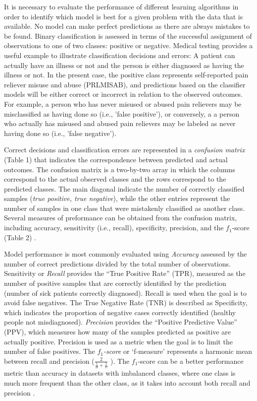 \documentclass[sigconf]{acmart}
\begin{document}
It is necessary to evaluate the performance of different learning algorithms
in order to identify which model is best for a given problem with the data 
that is available. No model can make perfect predictions as there are always 
mistakes to be found. Binary classification is assessed in terms of the 
successful assignment of observations to one of two classes: positive or 
negative. Medical testing provides a useful example to illustrate 
classification decisions and errors: A patient can actually have an illness 
or not and the person is either diagnosed as having the illness or not. In 
the present case, the positive class represents self-reported pain reliever 
misuse and abuse (PRLMISAB), and predictions based on the classifier models 
will be either correct or incorrect in relation to the observed outcomes. 
For example, a person who has never misused or abused pain relievers may be 
misclassified as having done so (i.e., 'false positive'), or conversely, a 
a person who actually has misused and abused pain relievers may be labeled 
as never having done so (i.e., 'false negative').


Correct decisions and classification errors are represented in a 
\emph{confusion matrix} (Table 1) that indicates the correspondence between 
predicted and actual outcomes. The confusion matrix is a two-by-two array in 
which the columns correspond to the actual observed classes and the rows 
correspond to the predicted classes. The main diagonal indicate the number of 
correctly classified samples (\emph{true positive, true negative}), while the 
other entries represent the number of samples in one class that were mistakenly 
classified as another class. Several measures of preformance can be obtained
from the confusion matrix, including accuracy, sensitivity (i.e., recall), 
specificity, precision, and the $f_1$-score (Table 2) \cite{kuhn13, wiki18}. 

Model performance is most commonly evaluated using \emph{Accuracy} assessed
by the number of correct predictions divided by the total number of 
observations. Sensitivity or \emph{Recall} provides the ``True Positive 
Rate'' (TPR), measured as the number of positive samples that are correctly 
identified by the prediction (number of sick patients correctly diagnosed). 
Recall is used when the goal is to avoid false negatives. The True Negative
Rate (TNR) is described as Specificity, which indicates the proportion of 
negative cases correctly identified (healthy people not misdiagnosed). 
\emph{Precision} provides the ``Positive Predictive Value'' (PPV), which 
measures how many of the samples predicted as positive are actually positive. 
Precision is used as a metric when the goal is to limit the number of false 
positives. The \emph{$f_1$-score} or `f-measure' represents a harmonic mean 
between recall and precision (\(\frac{2}{ \frac{1}{R} + \frac{1}{P} }\) ).
The $f_1$-score can be a better performance metric than accuracy 
in datasets with imbalanced classes, where one class is much more frequent 
than the other class, as it takes into account both recall and precision 
\cite{muller17, yun09}.
\end{document}
